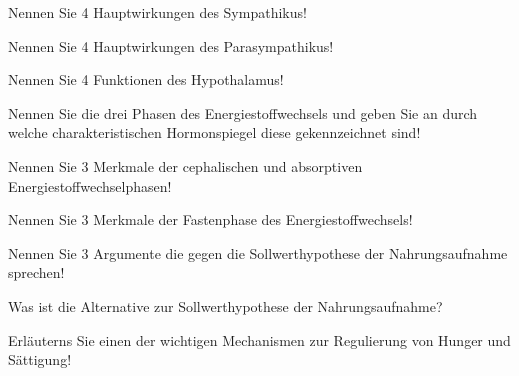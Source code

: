 \documentclass[10pt, a4paper]{exam}
\begin{document}
\begin{questions}
\begin{solution}
  \end{solution}

  \question Nennen Sie 4 Hauptwirkungen des Sympathikus!
  \begin{solution}

  \end{solution}

  \question Nennen Sie 4 Hauptwirkungen des Parasympathikus!
  \begin{solution}

  \end{solution}

  \question Nennen Sie 4 Funktionen des Hypothalamus!
  \begin{solution}

  \end{solution}

  \question Nennen Sie die drei Phasen des Energiestoffwechsels und geben Sie an durch welche charakteristischen Hormonspiegel diese gekennzeichnet sind!
  \begin{solution}

  \end{solution}

  \question Nennen Sie 3 Merkmale der cephalischen und absorptiven Energiestoffwechselphasen!
  \begin{solution}

  \end{solution}

  \question Nennen Sie 3 Merkmale der Fastenphase des Energiestoffwechsels!
  \begin{solution}

  \end{solution}

  \question Nennen Sie 3 Argumente die gegen die Sollwerthypothese der Nahrungsaufnahme sprechen!
  \begin{solution}

  \end{solution}

  \question Was ist die Alternative zur Sollwerthypothese der Nahrungsaufnahme?
  \begin{solution}

  \end{solution}

  \question Erläuterns Sie einen der wichtigen Mechanismen zur Regulierung von Hunger und Sättigung!
  \begin{solution}

  \end{solution}


\end{questions}
\end{document}
